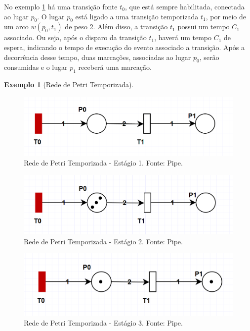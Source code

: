 \documentclass[
	12pt,				%
	openright,			%
	oneside,			%
	a4paper,			%
	english,			%
	brazil				%
	]{abntex2}
\newtheorem{exemplo}{Exemplo}
\begin{document}
No exemplo \ref{exemplo_temporarizada} há uma transição fonte $t_{0}$, que está sempre habilitada, conectada ao lugar $p_{0}$. O lugar $p_{0}$ está ligado a uma transição temporizada $t_{1}$, por meio de um arco $w(p_{0},t_{1})$ de peso 2. Além disso, a transição $t_{1}$ possui um tempo $C_{1}$ associado. Ou seja, após o disparo da transição $t_{1}$, haverá um tempo $C_{1}$ de espera, indicando o tempo de execução do evento associado a transição. Após a decorrência desse tempo, duas marcações, associadas ao lugar $p_{0}$, serão consumidas e o lugar $p_{1}$ receberá uma marcação.  

\begin{exemplo} [Rede de Petri Temporizada] \label{exemplo_temporarizada}
\end{exemplo}

\begin{figure}[ht] 
	\centering
	\includegraphics[scale=0.55]{figuras/exemplo_rede_petri_temporizada_1.png}
	\caption[Rede de Petri Temporizada - Estágio 1]{Rede de Petri Temporizada - Estágio 1. Fonte: Pipe.}
	\label{fig:rede_petri_temporizada_ex_01}
\end{figure}
\FloatBarrier

\begin{figure}[ht] 
	\centering
	\includegraphics[scale=0.55]{figuras/exemplo_rede_petri_temporizada_2.png}
	\caption[Rede de Petri Temporizada - Estágio 2]{Rede de Petri Temporizada - Estágio 2. Fonte: Pipe.}
	\label{fig:rede_petri_temporizada_ex_02}
\end{figure}
\FloatBarrier

\begin{figure}[ht] 
	\centering
	\includegraphics[scale=0.55]{figuras/exemplo_rede_petri_temporizada_3.png}
	\caption[Rede de Petri Temporizada - Estágio 3]{Rede de Petri Temporizada - Estágio 3. Fonte: Pipe.}
	\label{fig:rede_petri_temporizada_ex_03}
\end{figure}
\FloatBarrier
\end{document}
